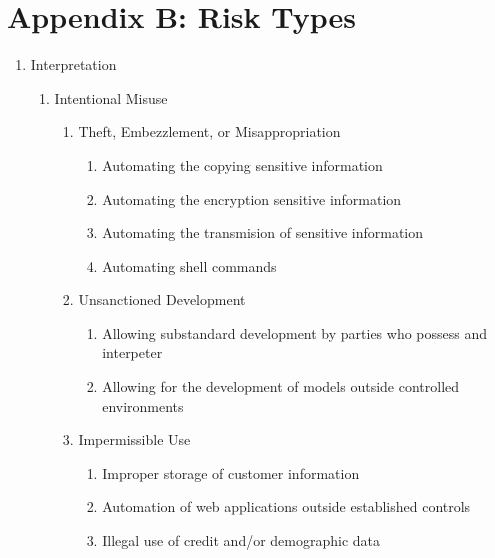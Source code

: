 \section{Appendix B: Risk Types}
\label{sec:appendix_b}

\thispagestyle{section_start_style}

\begin{enumerate}

        \item Interpretation
        \begin{enumerate}

                \item Intentional Misuse
                \begin{enumerate}
                        \item Theft, Embezzlement, or Misappropriation
                        \begin{enumerate}
                                \item Automating the copying sensitive information
                                \item Automating the encryption sensitive information
                                \item Automating the transmision of sensitive information
                                \item Automating shell commands
                        \end{enumerate}
                        \item Unsanctioned Development
                        \begin{enumerate}
                                \item Allowing substandard development by parties who possess and interpeter
                                \item Allowing for the development of models outside controlled environments
                        \end{enumerate}
                        \item Impermissible Use
                        \begin{enumerate}
                                \item Improper storage of customer information
                                \item Automation of web applications outside established controls
                                \item Illegal use of credit and/or demographic data
                        \end{enumerate}
                \end{enumerate}


\end{enumerate}
\end{enumerate}
